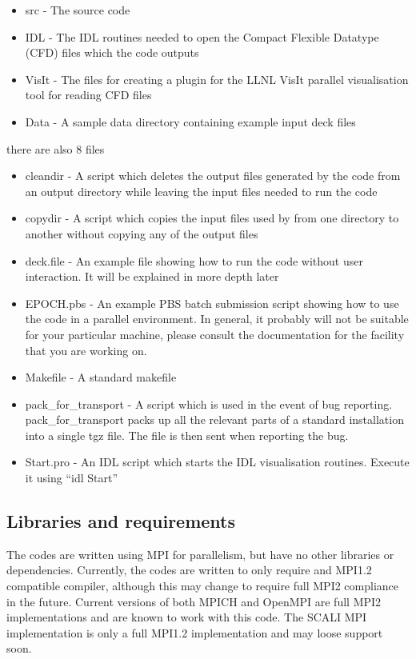 \documentclass[12pt,a4paper]{article}
\newcommand{\EPOCH}{{\color{warwickdark}\fontfamily{phv}\selectfont{EPOCH}}}
\begin{document}
\begin{itemize}
\item src - The {\EPOCH} source code
\item IDL - The IDL routines needed to open the Compact Flexible Datatype
  (CFD) files which the code outputs
\item VisIt - The files for creating a plugin for the LLNL VisIt parallel
  visualisation tool for reading CFD files
\item Data - A sample data directory containing example input deck files
\end{itemize}
there are also 8 files

\begin{itemize}
\item cleandir - A script which deletes the output files generated by the
  {\EPOCH} code from an output directory while leaving the input files needed to
  run the code
\item copydir - A script which copies the input files used by {\EPOCH} from one
  directory to another without copying any of the output files
\item deck.file - An example file showing how to run the code without user
  interaction. It will be explained in more depth later
\item EPOCH.pbs - An example PBS batch submission script showing how to use
  the code in a parallel environment. In general, it probably will not be
  suitable for your particular machine, please consult the documentation for
  the facility that you are working on.
\item Makefile - A standard makefile
\item pack\_for\_transport - A script which is used in the event of bug
  reporting. pack\_for\_transport packs up all the relevant parts of a
  standard {\EPOCH} installation into a single tgz file. The file is then sent
  when reporting the bug.
\item Start.pro - An IDL script which starts the IDL visualisation
  routines. Execute it using ``idl Start''
\end{itemize}

\subsection{Libraries and requirements}
The {\EPOCH} codes are written using MPI for parallelism, but have no other
libraries or dependencies. Currently, the codes are written to only require and
MPI1.2 compatible compiler, although this may change to require full MPI2
compliance in the future. Current versions of both MPICH and OpenMPI are full
MPI2 implementations and are known to work with this code. The SCALI MPI
implementation is only a full MPI1.2 implementation and may loose support
soon.\\
\end{document}
